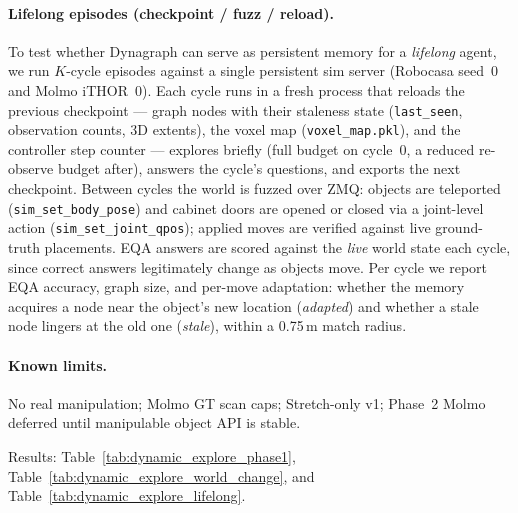 \paragraph{Lifelong episodes (checkpoint / fuzz / reload).}
To test whether Dynagraph can serve as persistent memory for a \emph{lifelong} agent, we run $K$-cycle episodes against a single persistent sim server (Robocasa seed~0 and Molmo iTHOR~0).
Each cycle runs in a fresh process that reloads the previous checkpoint --- graph nodes with their staleness state (\texttt{last\_seen}, observation counts, 3D extents), the voxel map (\texttt{voxel\_map.pkl}), and the controller step counter --- explores briefly (full budget on cycle~0, a reduced re-observe budget after), answers the cycle's questions, and exports the next checkpoint.
Between cycles the world is fuzzed over ZMQ: objects are teleported (\texttt{sim\_set\_body\_pose}) and cabinet doors are opened or closed via a joint-level action (\texttt{sim\_set\_joint\_qpos}); applied moves are verified against live ground-truth placements.
EQA answers are scored against the \emph{live} world state each cycle, since correct answers legitimately change as objects move.
Per cycle we report EQA accuracy, graph size, and per-move adaptation: whether the memory acquires a node near the object's new location (\emph{adapted}) and whether a stale node lingers at the old one (\emph{stale}), within a 0.75\,m match radius.

\paragraph{Known limits.}
No real manipulation; Molmo GT scan caps; Stretch-only v1; Phase~2 Molmo deferred until manipulable object API is stable.

Results: Table~\ref{tab:dynamic_explore_phase1}, Table~\ref{tab:dynamic_explore_world_change}, and Table~\ref{tab:dynamic_explore_lifelong}.
